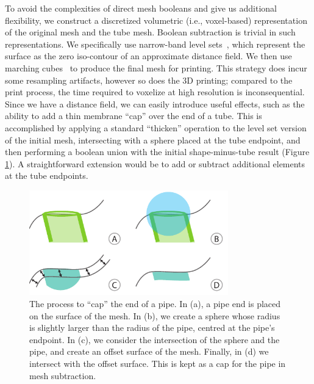 To avoid the complexities of direct mesh booleans and give us additional flexibility, we construct a discretized volumetric (i.e., voxel-based) representation of the original mesh and the tube mesh.  Boolean subtraction is trivial in such representations.  We specifically use narrow-band level sets~\cite{Museth04}, which represent the surface as the zero iso-contour of an
approximate distance field.
We then use marching cubes~\cite{Lorensen87} to produce the final mesh for printing.
This strategy does incur some resampling artifacts, however so does the 3D printing; compared to the print process, the time required to voxelize at high resolution is inconsequential.
Since we have a distance field, we can easily introduce useful effects, such as the
ability to add a thin membrane ``cap'' over the end of a tube. 
This is accomplished by applying a standard ``thicken'' operation to the level set version
of the initial mesh, intersecting with a sphere placed at the tube endpoint, and then performing
a boolean union with the initial shape-minus-tube result (Figure \ref{fig:cap}).
A straightforward extension would be to add or subtract additional elements at
the tube endpoints.

\begin{figure}[t]
\centering
    \includegraphics[width=3.4in]{figures/cap.pdf}
\caption{The process to ``cap'' the end of a pipe.  In (a), a pipe end is placed on the surface of the mesh.  In (b), we create a sphere whose radius is slightly larger than the radius of the pipe, centred at the pipe's endpoint.  In (c), we consider the intersection of the sphere and the pipe, and create an offset surface of the mesh.  Finally, in (d) we intersect with the offset surface.  This is kept as a cap for the pipe in mesh subtraction.}
\label{fig:cap}
\end{figure}

